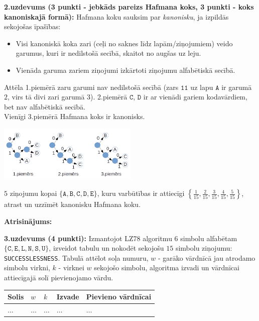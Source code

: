 \documentclass[11pt]{article}
\begin{document}
{\footnotesize
\vspace{6pt}
{\bf 2.uzdevums (3 punkti - jebkāds pareizs Hafmana koks, 3 punkti - koks kanoniskajā formā):}
Hafmana koku sauksim par {\em kanonisku}, ja izpildās sekojošas īpašības: 
\begin{itemize}
\item Visi kanoniskā koka zari (ceļi no saknes līdz lapām/ziņojumiem) veido garumus, kuri ir nedilstošā secībā, skaitot no augšas uz leju.
\item Vienāda garuma zariem ziņojumi izkārtoti ziņojumu alfabētiskā secībā. 
\end{itemize}
Attēla 1.piemērā zaru garumi nav nedilstošā secībā
(zars $\mathtt{11}$ uz lapu $\mathtt{A}$ ir garumā $2$, virs tā divi zari garumā $3$). 
2.piemērā $\mathtt{C}$, $\mathtt{D}$ ir ar vienādi gariem kodavārdiem, bet nav alfabētiskā secībā.\\
Vienīgi 3.piemērā Hafmana koks ir kanonisks.

\begin{center}
\includegraphics[width=0.5\textwidth]{huffman-examples.png}
\end{center}

$5$ ziņojumu kopai $\{ \mathtt{A},\mathtt{B},\mathtt{C},\mathtt{D},\mathtt{E} \}$, kuru varbūtības ir attiecīgi 
${\displaystyle \left\{ \frac{1}{15}, \frac{2}{15},\frac{3}{15},\frac{4}{15},\frac{5}{15} \right\}}$,
atrast un uzzīmēt kanonisku Hafmana koku.
}

\vspace{6pt}
{\bf Atrisinājums:}

{\footnotesize
\vspace{6pt}
{\bf 3.uzdevums (4 punkti):}
Izmantojot LZ78 algoritmu 6 simbolu alfabētam $\{\mathtt{C}, \mathtt{E}, \mathtt{L}, \mathtt{N},\mathtt{S}, \mathtt{U}\}$,
izveidot tabulu un nokodēt sekojošu $15$ simbolu ziņojumu: {\tt SUCCESSLESSNESS}. 
Tabulā attēlot soļa numuru, $w$ - garāko vārdnīcā jau atrodamo simbolu virkni, $k$ - virknei $w$ sekojošo simbolu, algoritma izvadi un 
vārdnīcai attiecīgajā solī pievienojamo vārdu. 

\begin{center}
\begin{tabular}{ |l|l|l|l|l| } \hline
Solis & $w$ & $k$ & Izvade & Pievieno vārdnīcai \\ \hline
$\ldots$ & $\ldots$ & $\ldots$ & $\ldots$ & $\ldots$ \\ \hline
\end{tabular}
\end{center}
}
\end{document}
